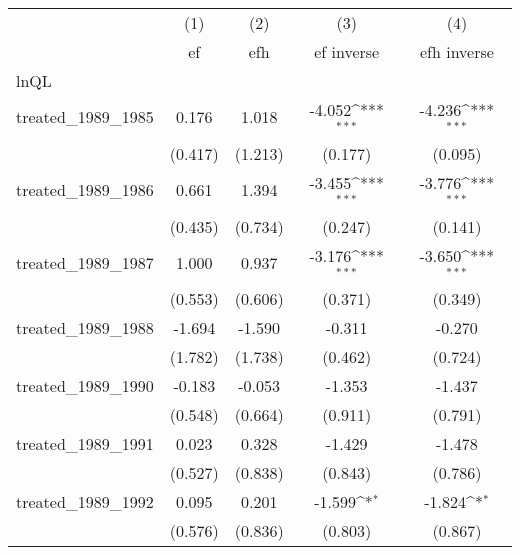 {
\def\sym#1{\ifmmode^{#1}\else\(^{#1}\)\fi}
\begin{tabular}{l*{4}{c}}
\hline\hline
            &\multicolumn{1}{c}{(1)}&\multicolumn{1}{c}{(2)}&\multicolumn{1}{c}{(3)}&\multicolumn{1}{c}{(4)}\\
            &\multicolumn{1}{c}{ef}&\multicolumn{1}{c}{efh}&\multicolumn{1}{c}{ef inverse}&\multicolumn{1}{c}{efh inverse}\\
\hline
lnQL        &                     &                     &                     &                     \\
treated\_1989\_1985&       0.176         &       1.018         &      -4.052\sym{***}&      -4.236\sym{***}\\
            &     (0.417)         &     (1.213)         &     (0.177)         &     (0.095)         \\
[1em]
treated\_1989\_1986&       0.661         &       1.394         &      -3.455\sym{***}&      -3.776\sym{***}\\
            &     (0.435)         &     (0.734)         &     (0.247)         &     (0.141)         \\
[1em]
treated\_1989\_1987&       1.000         &       0.937         &      -3.176\sym{***}&      -3.650\sym{***}\\
            &     (0.553)         &     (0.606)         &     (0.371)         &     (0.349)         \\
[1em]
treated\_1989\_1988&      -1.694         &      -1.590         &      -0.311         &      -0.270         \\
            &     (1.782)         &     (1.738)         &     (0.462)         &     (0.724)         \\
[1em]
treated\_1989\_1990&      -0.183         &      -0.053         &      -1.353         &      -1.437         \\
            &     (0.548)         &     (0.664)         &     (0.911)         &     (0.791)         \\
[1em]
treated\_1989\_1991&       0.023         &       0.328         &      -1.429         &      -1.478         \\
            &     (0.527)         &     (0.838)         &     (0.843)         &     (0.786)         \\
[1em]
treated\_1989\_1992&       0.095         &       0.201         &      -1.599\sym{*}  &      -1.824\sym{*}  \\
            &     (0.576)         &     (0.836)         &     (0.803)         &     (0.867)         \\

\end{tabular}}

